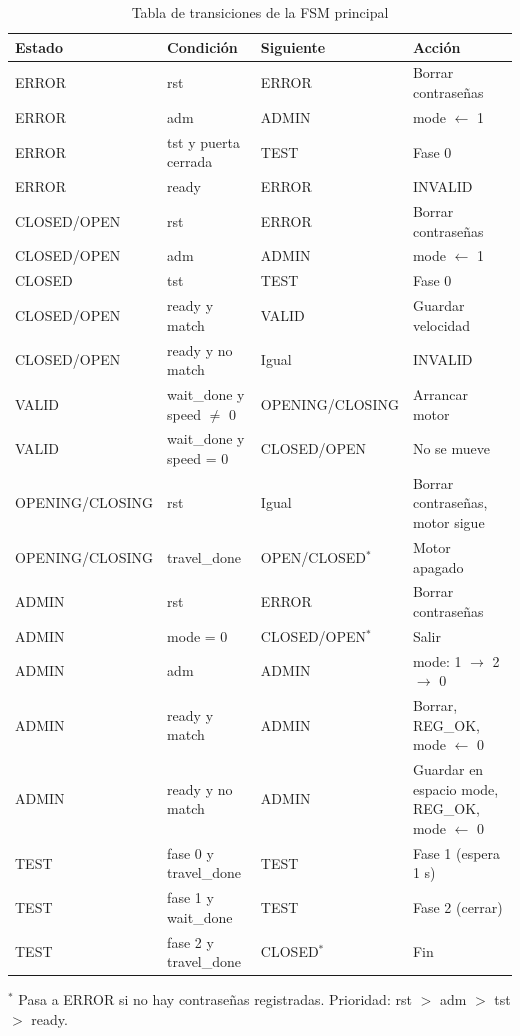 \documentclass[11pt,letterpaper]{article}
\begin{document}
\begin{table}[H]
\centering
\small
\caption{Tabla de transiciones de la FSM principal}
\begin{tabularx}{\textwidth}{l l l >{\raggedright\arraybackslash}X}
\toprule
\textbf{Estado} & \textbf{Condición} & \textbf{Siguiente} & \textbf{Acción} \\
\midrule
ERROR & rst & ERROR & Borrar contraseñas \\
ERROR & adm & ADMIN & mode $\leftarrow$ 1 \\
ERROR & tst y puerta cerrada & TEST & Fase 0 \\
ERROR & ready & ERROR & INVALID \\
\midrule
CLOSED/OPEN & rst & ERROR & Borrar contraseñas \\
CLOSED/OPEN & adm & ADMIN & mode $\leftarrow$ 1 \\
CLOSED & tst & TEST & Fase 0 \\
CLOSED/OPEN & ready y match & VALID & Guardar velocidad \\
CLOSED/OPEN & ready y no match & Igual & INVALID \\
\midrule
VALID & wait\_done y speed $\neq$ 0 & OPENING/CLOSING & Arrancar motor \\
VALID & wait\_done y speed = 0 & CLOSED/OPEN & No se mueve \\
\midrule
OPENING/CLOSING & rst & Igual & Borrar contraseñas, motor sigue \\
OPENING/CLOSING & travel\_done & OPEN/CLOSED$^*$ & Motor apagado \\
\midrule
ADMIN & rst & ERROR & Borrar contraseñas \\
ADMIN & mode = 0 & CLOSED/OPEN$^*$ & Salir \\
ADMIN & adm & ADMIN & mode: 1 $\to$ 2 $\to$ 0 \\
ADMIN & ready y match & ADMIN & Borrar, REG\_OK, mode $\leftarrow$ 0 \\
ADMIN & ready y no match & ADMIN & Guardar en espacio mode, REG\_OK, mode $\leftarrow$ 0 \\
\midrule
TEST & fase 0 y travel\_done & TEST & Fase 1 (espera 1 s) \\
TEST & fase 1 y wait\_done & TEST & Fase 2 (cerrar) \\
TEST & fase 2 y travel\_done & CLOSED$^*$ & Fin \\
\bottomrule
\end{tabularx}
 
\vspace{2pt}
\footnotesize $^*$ Pasa a ERROR si no hay contraseñas registradas. Prioridad: rst $>$ adm $>$ tst $>$ ready.
\end{table}
 
\end{document}
